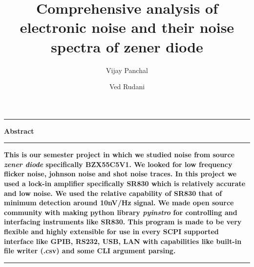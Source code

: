 \title{Comprehensive analysis of electronic noise and their noise spectra of zener diode}
\author{Vijay Panchal}
\author{Ved Rudani}
\address{Department of Physics, Electronics and Space Sciences, Gujarat University, Ahmedabad, India}

\maketitle
\begin{table*}[hbt!]\centering
  \vskip-60pt
  \parbox[h]{.75\textwidth}{\centering \hrule \vskip10pt\Large \textbf{Abstract} \vskip10pt \hrule \vskip10pt}
  \parbox[h]{.75\textwidth}{\normalsize \textbf{
       This is our semester project in which we studied noise from source \emph{zener diode} specifically BZX55C5V1. We looked for low frequency flicker noise, johnson noise and shot noise traces. In this project we used a lock-in amplifier specifically SR830 which is relatively accurate and low noise. We used the relative capability of SR830 that of minimum detection around 10nV/Hz signal. We made open source community with making python library \emph{pyinstro} for controlling and interfacing instruments like SR830. This program is made to be very flexible and highly extensible for use in every SCPI supported interface like GPIB, RS232, USB, LAN with capabilities like built-in file writer (.csv) and some CLI argument parsing.} \vskip10pt \hrule \vskip10pt}
\end{table*}
\clearpage
\begin{table*}[hbt!]\centering
\vskip-60pt
\parbox[h]{.75\textwidth}{\tableofcontents}
\end{table*}
\clearpage
